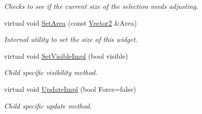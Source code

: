 \begin{DoxyCompactItemize}
\begin{DoxyCompactList}\small\item\em Checks to see if the current size of the selection needs adjusting. \item\end{DoxyCompactList}\item 
\hypertarget{classMezzanine_1_1UI_1_1ListBox_a157f39b08affbdde167de25151319f0c}{
virtual void \hyperlink{classMezzanine_1_1UI_1_1ListBox_a157f39b08affbdde167de25151319f0c}{SetArea} (const \hyperlink{classMezzanine_1_1Vector2}{Vector2} \&Area)}
\label{classMezzanine_1_1UI_1_1ListBox_a157f39b08affbdde167de25151319f0c}

\begin{DoxyCompactList}\small\item\em Internal utility to set the size of this widget. \item\end{DoxyCompactList}\item 
\hypertarget{classMezzanine_1_1UI_1_1ListBox_ad70ab1d9652ff71ca110034d2f0e1986}{
virtual void \hyperlink{classMezzanine_1_1UI_1_1ListBox_ad70ab1d9652ff71ca110034d2f0e1986}{SetVisibleImpl} (bool visible)}
\label{classMezzanine_1_1UI_1_1ListBox_ad70ab1d9652ff71ca110034d2f0e1986}

\begin{DoxyCompactList}\small\item\em Child specific visibility method. \item\end{DoxyCompactList}\item 
\hypertarget{classMezzanine_1_1UI_1_1ListBox_a929549e3a6a88d31cd16c9483a631379}{
virtual void \hyperlink{classMezzanine_1_1UI_1_1ListBox_a929549e3a6a88d31cd16c9483a631379}{UpdateImpl} (bool Force=false)}
\label{classMezzanine_1_1UI_1_1ListBox_a929549e3a6a88d31cd16c9483a631379}

\begin{DoxyCompactList}\small\item\em Child specific update method. \item\end{DoxyCompactList}\end{DoxyCompactItemize}
